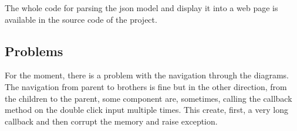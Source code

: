 The whole code for parsing the json model and display it into a web page is
available in the source code of the project.

\subsection{Problems}
\label{sec:problems}

For the moment, there is a problem with the navigation through the diagrams. The
navigation from parent to brothers is fine but in the other direction, from the
children to the parent, some component are, sometimes, calling the callback
method on the double click input multiple times. This create, first, a very long
callback and then corrupt the memory and raise exception.